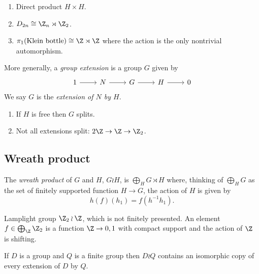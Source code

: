 \documentclass[a4paper]{article}
\begin{document}
\begin{eg}\leavevmode
  \begin{enumerate}
  \item Direct product \(H \times H\).
  \item \(D_{2n} \cong \Z_n \rtimes \Z_2\).
  \item \(\pi_1(\text{Klein bottle}) \cong \Z \rtimes \Z\) where the action is the only nontrivial automorphism.
  \end{enumerate}
\end{eg}

More generally, a \emph{group extension} is a group \(G\) given by
\[
  \begin{tikzcd}
    1 \ar[r] & N \ar[r] & G \ar[r] & H \ar[r] & 0
  \end{tikzcd}
\]
We say \(G\) is the \emph{extension of \(N\) by \(H\)}.

\begin{note}\leavevmode
  \begin{enumerate}
  \item If \(H\) is free then \(G\) splits.
  \item Not all extensions split: \(2\Z \to \Z \to \Z_2\).
  \end{enumerate}
\end{note}

\subsection{Wreath product}

\begin{definition}
    The \emph{wreath product} of \(G\) and \(H\), \(G \wr H\), is \(\bigoplus_H G \rtimes H\) where, thinking of \(\bigoplus_H G\) as the set of finitely supported function \(H \to G\), the action of \(H\) is given by
    \[
      h(f)(h_1) = f(h^{-1}h_1).
    \]
\end{definition}

\begin{eg}
  Lamplight group \(\Z_2 \wr \Z\), which is not finitely presented. An element \(f \in \bigoplus_\Z \Z_2\) is a function \(\Z \to 0, 1\) with compact support and the action of \(\Z\) is shifting.
\end{eg}

\begin{theorem}
  If \(D\) is a group and \(Q\) is a finite group then \(D \wr Q\) contains an isomorphic copy of every extension of \(D\) by \(Q\).
\end{theorem}
\end{document}
